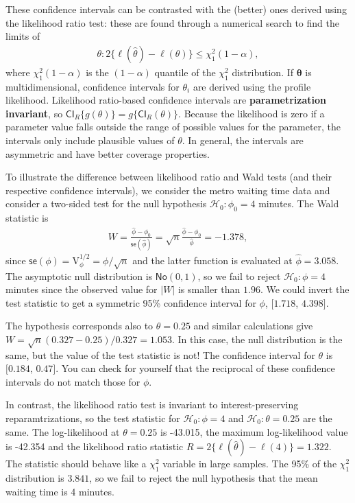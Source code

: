 \documentclass[
  11pt,
  letterpaper,
]{book}
\theoremstyle{definition}
\theoremstyle{definition}
\theoremstyle{definition}
\theoremstyle{remark}
\begin{document}
These confidence intervals can be contrasted with the (better) ones derived using the likelihood ratio test: these are found through a numerical search to find the limits of
\begin{align*}
\theta: 2\{\ell(\widehat{\theta}) - \ell(\theta)\} \leq \chi^2_1(1-\alpha),
\end{align*}
where \(\chi^2_1(1-\alpha)\) is the \((1-\alpha)\) quantile of the \(\chi^2_1\) distribution. If \(\boldsymbol{\theta}\) is multidimensional, confidence intervals for \(\theta_i\) are derived using the profile likelihood. Likelihood ratio-based confidence intervals are \textbf{parametrization invariant}, so \(\mathsf{CI}_{R}\{g(\theta)\} = g\{\mathsf{CI}_{R}(\theta)\}\). Because the likelihood is zero if a parameter value falls outside the range of possible values for the parameter, the intervals only include plausible values of \(\theta\). In general, the intervals are asymmetric and have better coverage properties.

To illustrate the difference between likelihood ratio and Wald tests (and their respective confidence intervals), we consider the metro waiting time data and consider a two-sided test for the null hypothesis \(\mathscr{H}_0: \phi_0=4\) minutes. The Wald statistic is
\begin{align*}
W =\frac{\hat{\phi}-\phi_0}{\mathsf{se}(\widehat{\phi})}=\sqrt{n}\frac{\widehat{\phi}-\phi_0}{\widehat{\phi}}= -1.378,
\end{align*}
since \(\mathsf{se}(\phi)=\mathrm{V}^{1/2}_{\phi}=\phi/\sqrt{n}\) and the latter function is evaluated at \(\widehat{\phi}=3.058\). The asymptotic null distribution is \(\mathsf{No}(0,1)\), so we fail to reject \(\mathscr{H}_0: \phi=4\) minutes since the observed value for \(|W|\) is smaller than \(1.96\). We could invert the test statistic to get a symmetric 95\% confidence interval for \(\phi\), \([1.718\), \(4.398]\).

The hypothesis corresponds also to \(\theta=0.25\) and similar calculations give \(W = \sqrt{n}(0.327 - 0.25)/0.327 = 1.053\). In this case, the null distribution is the same, but the value of the test statistic is not! The confidence interval for \(\theta\) is \([0.184\), \(0.47]\). You can check for yourself that the reciprocal of these confidence intervals do not match those for \(\phi\).

In contrast, the likelihood ratio test is invariant to interest-preserving reparamtrizations, so the test statistic for \(\mathscr{H}_0: \phi=4\) and \(\mathscr{H}_0: \theta = 0.25\) are the same. The log-likelihood at \(\theta=0.25\) is -43.015, the maximum log-likelihood value is -42.354
and the likelihood ratio statistic \(R=2 \{\ell(\widehat{\theta}) - \ell(4)\}= 1.322\). The statistic should behave like a \(\chi^2_1\) variable in large samples. The 95\% of the \(\chi^2_1\) distribution is \(3.841\), so we fail to reject the null hypothesis that the mean waiting time is 4 minutes.
\end{document}
